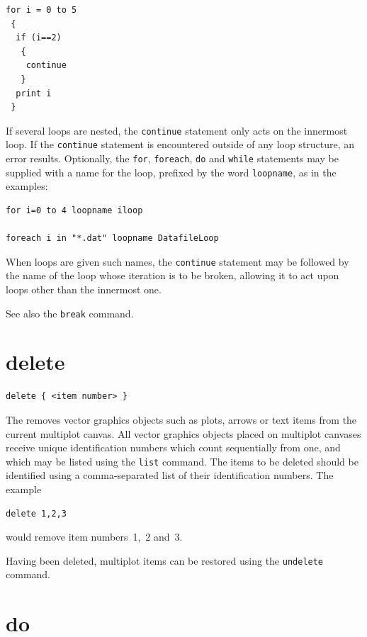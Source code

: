 \begin{verbatim}
for i = 0 to 5
 {
  if (i==2)
   {
    continue
   }
  print i
 }
\end{verbatim}

If several loops are nested, the {\tt continue} statement only
acts on the innermost loop. If the {\tt continue} statement is encountered outside of any
loop structure, an error results. Optionally, the {\tt for}, {\tt foreach},
{\tt do} and {\tt while} statements may be supplied with a name for the loop, prefixed by
the word {\tt loopname}, as in the examples:

\begin{verbatim}
for i=0 to 4 loopname iloop

foreach i in "*.dat" loopname DatafileLoop
\end{verbatim}

\noindent When loops are given such names, the {\tt continue} statement may be
followed by the name of the loop whose iteration is to be broken, allowing it
to act upon loops other than the innermost one.

See also the {\tt break} command.


\section{delete}

\begin{verbatim}
delete { <item number> }
\end{verbatim}

The  removes vector graphics objects such as plots, arrows or
text items from the current multiplot canvas. All vector graphics objects
placed on multiplot canvases receive unique identification numbers which count
sequentially from one, and which may be listed using the {\tt list} command.
The items to be deleted should be identified using a comma-separated list of
their identification numbers. The example

\begin{verbatim}
delete 1,2,3
\end{verbatim}

\noindent would remove item numbers~1,~2 and~3.

Having been deleted, multiplot items can be restored using the {\tt undelete}
command.


\section{do}

